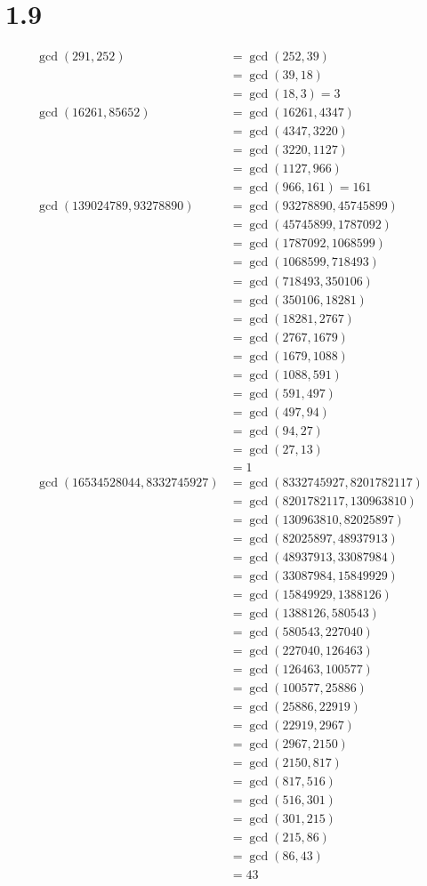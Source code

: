 \documentclass{article}
\begin{document}
\section*{1.9}
\begin{equation*}
\begin{split}
\gcd(291,252) &= \gcd(252,39)\\
&= \gcd(39,18)\\
&= \gcd(18,3) = 3\\
\gcd(16261,85652) &= \gcd(16261,4347)\\
&= \gcd(4347,3220)\\
&= \gcd(3220,1127)\\
&= \gcd(1127,966)\\
&= \gcd(966,161) = 161\\
\gcd(139024789,93278890) &= \gcd(93278890,45745899)\\
&= \gcd(45745899,1787092)\\
&= \gcd(1787092,1068599)\\
&= \gcd(1068599,718493)\\
&= \gcd(718493,350106)\\
&= \gcd(350106,18281)\\
&= \gcd(18281,2767)\\
&= \gcd(2767,1679)\\
&= \gcd(1679,1088)\\
&= \gcd(1088,591)\\
&= \gcd(591,497)\\
&= \gcd(497,94)\\
&= \gcd(94,27)\\
&= \gcd(27,13)\\
&= 1\\
\gcd(16534528044,8332745927) &= \gcd(8332745927,8201782117)\\
&= \gcd(8201782117,130963810)\\
&= \gcd(130963810,82025897)\\
&= \gcd(82025897,48937913)\\
&= \gcd(48937913,33087984)\\
&= \gcd(33087984,15849929)\\
&= \gcd(15849929,1388126)\\
&= \gcd(1388126,580543)\\
&= \gcd(580543,227040)\\
&= \gcd(227040,126463)\\
&= \gcd(126463,100577)\\
&= \gcd(100577,25886)\\
&= \gcd(25886,22919)\\
&= \gcd(22919,2967)\\
&= \gcd(2967,2150)\\
&= \gcd(2150,817)\\
&= \gcd(817,516)\\
&= \gcd(516,301)\\
&= \gcd(301,215)\\
&= \gcd(215,86)\\
&= \gcd(86,43)\\
&= 43
\end{split}
\end{equation*}
\end{document}
